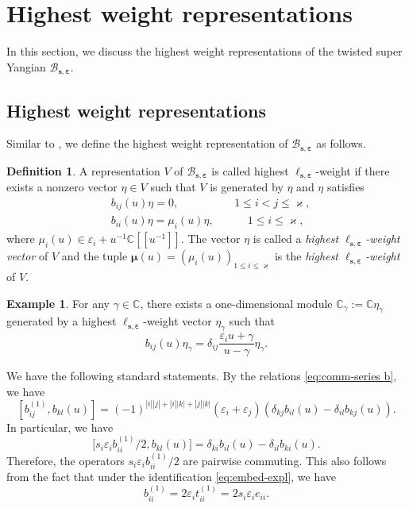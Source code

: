 \documentclass[11pt,reqno]{amsart}
\numberwithin{equation}{section}
\theoremstyle{definition}
\newtheorem{eg}[thm]{Example}
\newtheorem{dfn}[thm]{Definition}
\theoremstyle{remark}
\newcommand{\beq}{\begin{equation}}
\newcommand{\eeq}{\end{equation}}
\newcommand{\C}{\mathbb{C}}
\newcommand{\bC}{\mathbb{C}}
\newcommand{\lle}{\leqslant}
\newcommand{\BMN}{{\mathscr{B}_{\bm s,\bm \ve}}}
\newcommand{\ka}{\varkappa}
\newcommand{\ve}{\varepsilon}
\newcommand{\qedd}{\tag*{$\square$}}
\newcommand{\s}{{\bm s}}
\begin{document}
\section{Highest weight representations}\label{sec:reps}
In this section, we discuss the highest weight representations of the twisted super Yangian $\BMN$.
\subsection{Highest weight representations}
Similar to \cite{Molev2002reflection}, we define the highest weight representation of $\BMN$ as follows.
\begin{dfn}
A representation $V$ of $\BMN$ is called highest $\ell_{\s,\bm\ve}$-weight if there exists a nonzero vector $\eta\in V$ such that $V$ is generated by $\eta$ and $\eta$ satisfies
\beq\label{eq:highest-B}
\begin{split}
   & b_{ij}(u)\eta=0,  \qquad \quad\quad \quad 1\lle i<j\lle \ka,\\
   &    b_{ii}(u)\eta=\mu_i(u)\eta,\qquad\quad  1\lle i\lle \ka,
\end{split}
\eeq
where $\mu_i(u)\in \ve_i+u^{-1}\C[[u^{-1}]]$. The vector $\eta$ is called a {\it highest $\ell_{\s,\bm\ve}$-weight vector} of $V$ and the tuple $\bm \mu(u)=(\mu_i(u))_{1\lle i\lle \ka}$ is the {\it highest $\ell_{\s,\bm\ve}$-weight} of $V$.
\end{dfn}

\begin{eg}\label{eg:1-dim}
For any $\gamma\in\bC$, there exists a one-dimensional module $\bC_{\gamma}:=\bC \eta_{\gamma}$ generated by a highest $\ell_{\s,\bm\ve}$-weight vector $\eta_{\gamma}$  such that
\[
b_{ij}(u)\eta_\gamma = \delta_{ij}\frac{\ve_iu+\gamma}{u-\gamma}\eta_\gamma.\qedd
\]
\end{eg}

We have the following standard statements. By the relations \eqref{eq:comm-series b}, we have
\[
[b_{ij}^{(1)},b_{kl}(u)]=(-1)^{|i||j|+|i||k|+|j||k|}(\ve_i+\ve_j)(\delta_{kj}b_{il}(u)-\delta_{il}b_{kj}(u)).
\]
In particular, we have
\beq\label{eq:bii-weightb}
\big[s_i\ve_ib_{ii}^{(1)}/2,b_{kl}(u)\big]=\delta_{ki}b_{il}(u)-\delta_{il}b_{ki}(u).
\eeq
Therefore, the operators $s_i\ve_ib_{ii}^{(1)}/2$ are pairwise commuting. This also follows from the fact that under the identification \eqref{eq:embed-expl}, we have
\[
b_{ii}^{(1)}=2\ve_i t_{ii}^{(1)}=2s_i\ve_ie_{ii}.
\]
\end{document}

